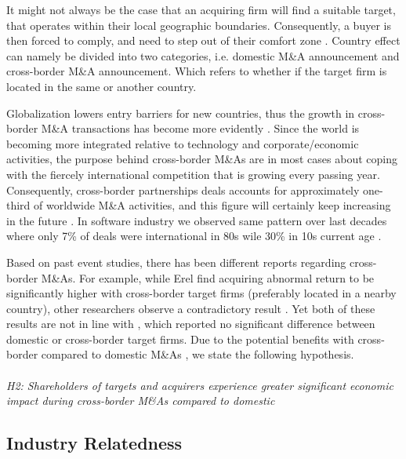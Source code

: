 It might not always be the case that an acquiring firm will find a suitable target, that operates within their local geographic boundaries. Consequently, a buyer is then forced to comply, and need to step out of their comfort zone \cite{Huysman}. Country effect can namely be divided into two categories, i.e. domestic M\&A announcement and cross-border M\&A announcement. Which refers to whether if the target firm is located in the same or another country.

Globalization lowers entry barriers for new countries, thus the growth in cross-border M\&A transactions has become more evidently \cite{Mateev} . Since the world is becoming more integrated relative to technology and corporate/economic activities, the purpose behind cross-border M\&As are in most cases about coping with the fiercely international competition that is growing every passing year. Consequently, cross-border partnerships deals accounts for approximately one-third of worldwide M\&A activities, and this figure will certainly keep increasing in the future \cite{erel}. In software industry we observed same pattern over last decades where only 7\% of deals were international in 80s wile 30\% in 10s current age \cite{quo vadis}.

Based on past event studies, there has been different reports regarding cross-border M\&As. For example, while Erel \cite{erel} find acquiring abnormal return to be significantly higher with cross-border target firms (preferably located in a nearby country), other researchers observe a contradictory result \cite{BOUBAKRI20121,andrade}. Yet both of these results are not in line with \cite{Mateev}, which reported no significant difference between domestic or cross-border target firms. Due to the potential benefits with cross-border compared to domestic M\&As \cite{MateevAndovan}, we state the following hypothesis. 
\\
\\
\textit{H2: Shareholders of targets and acquirers experience greater significant economic impact during cross-border M\&As 
compared to domestic}
\\
\subsection{Industry Relatedness}


